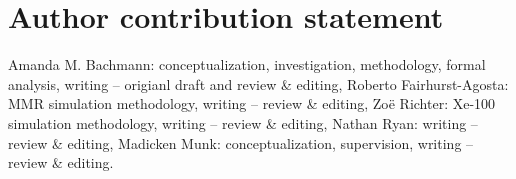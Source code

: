 \section*{Author contribution statement}
Amanda M. Bachmann: conceptualization, investigation, methodology, 
formal analysis, writing -- origianl draft and review \& editing, 
Roberto Fairhurst-Agosta: MMR simulation methodology, writing -- review \& editing, 
Zo\"{e} Richter: Xe-100 simulation methodology, writing -- review \& editing, 
Nathan Ryan: writing -- review \& editing, 
Madicken Munk: conceptualization, supervision, writing -- review \& editing. 